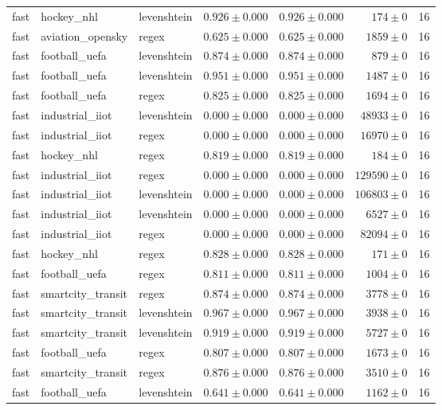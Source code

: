 \begin{table}[htbp]
\begin{tabular}{l l l r r r r}
fast & hockey\_nhl & levenshtein & $0.926\pm0.000$ & $0.926\pm0.000$ & $174\pm0$ & 16 \\
fast & aviation\_opensky & regex & $0.625\pm0.000$ & $0.625\pm0.000$ & $1859\pm0$ & 16 \\
fast & football\_uefa & levenshtein & $0.874\pm0.000$ & $0.874\pm0.000$ & $879\pm0$ & 16 \\
fast & football\_uefa & levenshtein & $0.951\pm0.000$ & $0.951\pm0.000$ & $1487\pm0$ & 16 \\
fast & football\_uefa & regex & $0.825\pm0.000$ & $0.825\pm0.000$ & $1694\pm0$ & 16 \\
fast & industrial\_iiot & levenshtein & $0.000\pm0.000$ & $0.000\pm0.000$ & $48933\pm0$ & 16 \\
fast & industrial\_iiot & regex & $0.000\pm0.000$ & $0.000\pm0.000$ & $16970\pm0$ & 16 \\
fast & hockey\_nhl & regex & $0.819\pm0.000$ & $0.819\pm0.000$ & $184\pm0$ & 16 \\
fast & industrial\_iiot & regex & $0.000\pm0.000$ & $0.000\pm0.000$ & $129590\pm0$ & 16 \\
fast & industrial\_iiot & levenshtein & $0.000\pm0.000$ & $0.000\pm0.000$ & $106803\pm0$ & 16 \\
fast & industrial\_iiot & levenshtein & $0.000\pm0.000$ & $0.000\pm0.000$ & $6527\pm0$ & 16 \\
fast & industrial\_iiot & regex & $0.000\pm0.000$ & $0.000\pm0.000$ & $82094\pm0$ & 16 \\
fast & hockey\_nhl & regex & $0.828\pm0.000$ & $0.828\pm0.000$ & $171\pm0$ & 16 \\
fast & football\_uefa & regex & $0.811\pm0.000$ & $0.811\pm0.000$ & $1004\pm0$ & 16 \\
fast & smartcity\_transit & regex & $0.874\pm0.000$ & $0.874\pm0.000$ & $3778\pm0$ & 16 \\
fast & smartcity\_transit & levenshtein & $0.967\pm0.000$ & $0.967\pm0.000$ & $3938\pm0$ & 16 \\
fast & smartcity\_transit & levenshtein & $0.919\pm0.000$ & $0.919\pm0.000$ & $5727\pm0$ & 16 \\
fast & football\_uefa & regex & $0.807\pm0.000$ & $0.807\pm0.000$ & $1673\pm0$ & 16 \\
fast & smartcity\_transit & regex & $0.876\pm0.000$ & $0.876\pm0.000$ & $3510\pm0$ & 16 \\
fast & football\_uefa & levenshtein & $0.641\pm0.000$ & $0.641\pm0.000$ & $1162\pm0$ & 16 \\

\end{tabular}
\end{table}
